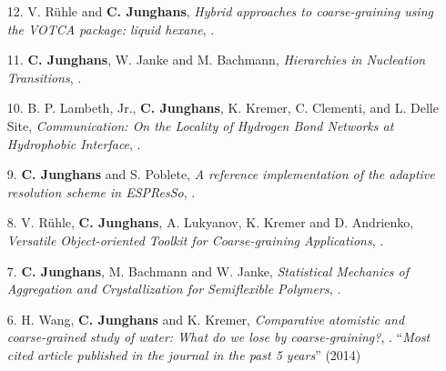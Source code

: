 \documentclass{article}
\begin{document}
\begin{enumerate}
\item[12.] V. R{\"u}hle and \textbf{C. Junghans},
  \textit{Hybrid approaches to coarse-graining using the VOTCA package: liquid hexane},
  .

\item[11.] \textbf{C. Junghans}, W. Janke and M. Bachmann,
  \textit{Hierarchies in Nucleation Transitions},
  .

\item[10.] B. P. Lambeth, Jr., \textbf{C. Junghans}, K. Kremer, C. Clementi, and L. Delle Site, 
  \textit{Communication: On the Locality of Hydrogen Bond Networks at Hydrophobic Interface},
  .

\item[9.] \textbf{C. Junghans} and S. Poblete,
  \textit{A reference implementation of the adaptive resolution scheme in ESPResSo},
  .

\item[8.] V. R{\"u}hle, \textbf{C. Junghans}, A. Lukyanov, K. Kremer and D. Andrienko,
  \textit{Versatile Object-oriented Toolkit for Coarse-graining Applications},
  . 

\item[7.] \textbf{C. Junghans}, M. Bachmann and W. Janke,
  \textit{Statistical Mechanics of Aggregation and Crystallization for Semiflexible Polymers},
  .

\item[6.] H. Wang, \textbf{C. Junghans} and K. Kremer,
  \textit{Comparative atomistic and coarse-grained study of water: What do we lose by coarse-graining?},
  . 
  ``\emph{Most cited article published in the journal in the past 5 years}'' (2014)


\end{enumerate}
\end{document}
